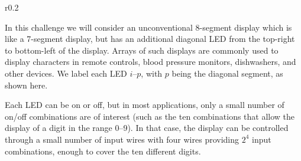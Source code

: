 \documentclass[11pt]{article}
\newcounter{challenge}
\begin{document}
\begin{wrapfigure}[10]{r}{0.2\textwidth}
\vspace*{-20pt}
\begin{center}
\end{center}
\end{wrapfigure}

In this challenge we will consider an unconventional 8-segment display 
which is like a 7-segment display, but has an additional diagonal
LED from the top-right to bottom-left of the display. 
Arrays of such displays are commonly used to display characters in 
remote controls, blood pressure monitors, dishwashers, and other devices.
We label each LED $i$--$p$, with $p$ being the diagonal segment,
as shown here. 

Each LED can be on or off, but in most applications, 
only a small number of on/off combinations are of interest
(such as the ten combinations that allow the display of a digit 
in the range 0--9).
In that case, the display can be controlled through a small number of
input wires with four wires providing $2^4$ input combinations,
enough to cover the ten different digits.
\end{document}
